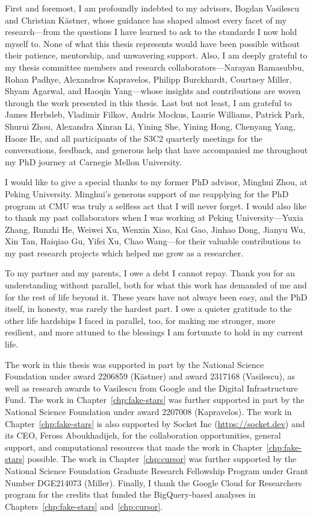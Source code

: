 \documentclass[12pt, openany]{cmuthesis}
\begin{document}
\begin{acknowledgments}
First and foremost, I am profoundly indebted to my advisors, Bogdan Vasilescu and Christian Kästner, whose guidance has shaped almost every facet of my research---from the questions I have learned to ask to the standards I now hold myself to.
None of what this thesis represents would have been possible without their patience, mentorship, and unwavering support.
Also, I am deeply grateful to my thesis committee members and research collaborators---Narayan Ramasubbu, Rohan Padhye, Alexandros Kapravelos, Philipp Burckhardt, Courtney Miller, Shyam Agarwal, and Haoqin Yang---whose insights and contributions are woven through the work presented in this thesis.
Last but not least, I am grateful to James Herbsleb, Vladimir Filkov, Audris Mockus, Laurie Williams, Patrick Park, Shurui Zhou, Alexandra Xinran Li, Yining She, Yining Hong, Chenyang Yang, Haoze He, and all participants of the S3C2 quarterly meetings for the conversations, feedback, and generous help that have accompanied me throughout my PhD journey at Carnegie Mellon University.

I would like to give a special thanks to my former PhD advisor, Minghui Zhou, at Peking University.
Minghui's generous support of me reapplying for the PhD program at CMU was truly a selfless act that I will never forget.
I would also like to thank my past collaborators when I was working at Peking University---Yuxia Zhang, Runzhi He, Weiwei Xu, Wenxin Xiao, Kai Gao, Jinhao Dong, Jianyu Wu, Xin Tan, Haiqiao Gu, Yifei Xu, Chao Wang---for their valuable contributions to my past research projects which helped me grow as a researcher.

To my partner and my parents, I owe a debt I cannot repay.
Thank you for an understanding without parallel, both for what this work has demanded of me and for the rest of life beyond it.
These years have not always been easy, and the PhD itself, in honesty, was rarely the hardest part.
I owe a quieter gratitude to the other life hardships I faced in parallel, too, for making me stronger, more resilient, and more attuned to the blessings I am fortunate to hold in my current life.

The work in this thesis was supported in part by the National Science Foundation under award 2206859 (Kästner) and award 2317168 (Vasilescu), as well as research awards to Vasilescu from Google and the Digital Infrastructure Fund.
The work in Chapter~\ref{chp:fake-stars} was further supported in part by the National Science Foundation under award 2207008 (Kapravelos).
The work in Chapter~\ref{chp:fake-stars} is also supported by Socket Inc (\url{https://socket.dev}) and its CEO, Feross Aboukhadijeh, for the collaboration opportunities, general support, and computational resources that made the work in Chapter~\ref{chp:fake-stars} possible.
The work in Chapter~\ref{chp:cursor} was further supported by the National Science Foundation Graduate Research Fellowship Program under Grant Number DGE214073 (Miller). 
Finally, I thank the Google Cloud for Researchers program for the credits that funded the BigQuery-based analyses in Chapters~\ref{chp:fake-stars} and~\ref{chp:cursor}.
\end{acknowledgments}
\end{document}
